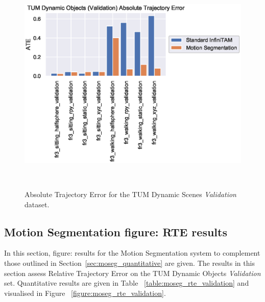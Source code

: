 \begin{figure}[!htbp]
  \centering
  \includegraphics[width=0.95\linewidth]{figures/moseg/ate_validation.eps}
  \caption[Motion Segmentation ATE Validation Set]
  {Absolute Trajectory Error for the TUM Dynamic Scenes
    \textit{Validation} dataset.}
~\label{figure:moseg_ate_validation}
\end{figure}

\subsection{Motion Segmentation figure: RTE results}
In this section, figure: results for the Motion Segmentation system
to complement those outlined in Section~\ref{sec:moseg_quantitative} are given.
The results in this section assess Relative Trajectory Error on the TUM Dynamic
Objects \textit{Validation} set. Quantitative results are given in Table
~\ref{table:moseg_rte_validation} and visualised in Figure
~\ref{figure:moseg_rte_validation}.

